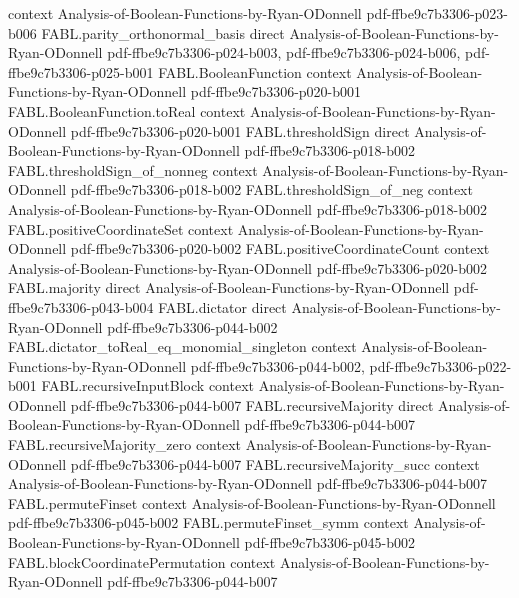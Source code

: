 \begin{theorem}
  {context}
  {Analysis-of-Boolean-Functions-by-Ryan-ODonnell}
  {pdf-ffbe9c7b3306-p023-b006}
\proofstep
  {FABL.parity_orthonormal_basis}
  {direct}
  {Analysis-of-Boolean-Functions-by-Ryan-ODonnell}
  {pdf-ffbe9c7b3306-p024-b003,
    pdf-ffbe9c7b3306-p024-b006,
    pdf-ffbe9c7b3306-p025-b001}
\proofstep
  {FABL.BooleanFunction}
  {context}
  {Analysis-of-Boolean-Functions-by-Ryan-ODonnell}
  {pdf-ffbe9c7b3306-p020-b001}
\proofstep
  {FABL.BooleanFunction.toReal}
  {context}
  {Analysis-of-Boolean-Functions-by-Ryan-ODonnell}
  {pdf-ffbe9c7b3306-p020-b001}
\proofstep
  {FABL.thresholdSign}
  {direct}
  {Analysis-of-Boolean-Functions-by-Ryan-ODonnell}
  {pdf-ffbe9c7b3306-p018-b002}
\proofstep
  {FABL.thresholdSign_of_nonneg}
  {context}
  {Analysis-of-Boolean-Functions-by-Ryan-ODonnell}
  {pdf-ffbe9c7b3306-p018-b002}
\proofstep
  {FABL.thresholdSign_of_neg}
  {context}
  {Analysis-of-Boolean-Functions-by-Ryan-ODonnell}
  {pdf-ffbe9c7b3306-p018-b002}
\proofstep
  {FABL.positiveCoordinateSet}
  {context}
  {Analysis-of-Boolean-Functions-by-Ryan-ODonnell}
  {pdf-ffbe9c7b3306-p020-b002}
\proofstep
  {FABL.positiveCoordinateCount}
  {context}
  {Analysis-of-Boolean-Functions-by-Ryan-ODonnell}
  {pdf-ffbe9c7b3306-p020-b002}
\proofstep
  {FABL.majority}
  {direct}
  {Analysis-of-Boolean-Functions-by-Ryan-ODonnell}
  {pdf-ffbe9c7b3306-p043-b004}
\proofstep
  {FABL.dictator}
  {direct}
  {Analysis-of-Boolean-Functions-by-Ryan-ODonnell}
  {pdf-ffbe9c7b3306-p044-b002}
\proofstep
  {FABL.dictator_toReal_eq_monomial_singleton}
  {context}
  {Analysis-of-Boolean-Functions-by-Ryan-ODonnell}
  {pdf-ffbe9c7b3306-p044-b002,
    pdf-ffbe9c7b3306-p022-b001}
\proofstep
  {FABL.recursiveInputBlock}
  {context}
  {Analysis-of-Boolean-Functions-by-Ryan-ODonnell}
  {pdf-ffbe9c7b3306-p044-b007}
\proofstep
  {FABL.recursiveMajority}
  {direct}
  {Analysis-of-Boolean-Functions-by-Ryan-ODonnell}
  {pdf-ffbe9c7b3306-p044-b007}
\proofstep
  {FABL.recursiveMajority_zero}
  {context}
  {Analysis-of-Boolean-Functions-by-Ryan-ODonnell}
  {pdf-ffbe9c7b3306-p044-b007}
\proofstep
  {FABL.recursiveMajority_succ}
  {context}
  {Analysis-of-Boolean-Functions-by-Ryan-ODonnell}
  {pdf-ffbe9c7b3306-p044-b007}
\proofstep
  {FABL.permuteFinset}
  {context}
  {Analysis-of-Boolean-Functions-by-Ryan-ODonnell}
  {pdf-ffbe9c7b3306-p045-b002}
\proofstep
  {FABL.permuteFinset_symm}
  {context}
  {Analysis-of-Boolean-Functions-by-Ryan-ODonnell}
  {pdf-ffbe9c7b3306-p045-b002}
\proofstep
  {FABL.blockCoordinatePermutation}
  {context}
  {Analysis-of-Boolean-Functions-by-Ryan-ODonnell}
  {pdf-ffbe9c7b3306-p044-b007}

\end{theorem}
